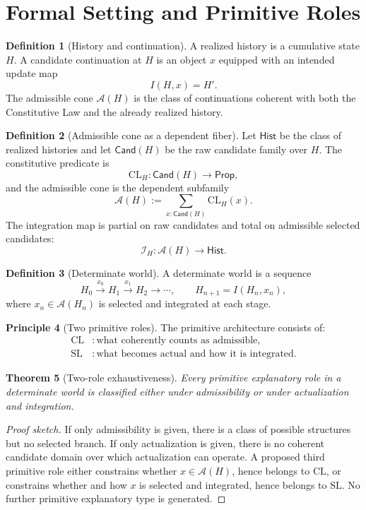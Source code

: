 \documentclass[11pt]{article}
\theoremstyle{plain}
\newtheorem{theorem}{Theorem}[section]
\theoremstyle{definition}
\newtheorem{definition}[theorem]{Definition}
\newtheorem{principle}[theorem]{Principle}
\theoremstyle{remark}
\newenvironment{proofsketch}{\begin{proof}[Proof sketch]}{\end{proof}}
\newcommand{\CL}{\mathrm{CL}}
\newcommand{\SLaw}{\mathrm{SL}}
\newcommand{\A}{\mathcal{A}}
\newcommand{\I}{\mathcal{I}}
\newcommand{\Hist}{\mathsf{Hist}}
\newcommand{\Cand}{\mathsf{Cand}}
\begin{document}
\section{Formal Setting and Primitive Roles}

\begin{definition}[History and continuation]
A realized history is a cumulative state \(H\). A candidate continuation at \(H\) is an object \(x\) equipped with an intended update map
\[
I(H,x)=H'.
\]
The admissible cone \(\A(H)\) is the class of continuations coherent with both the Constitutive Law and the already realized history.
\end{definition}

\begin{definition}[Admissible cone as a dependent fiber]
Let \(\Hist\) be the class of realized histories and let \(\Cand(H)\) be the raw candidate family over \(H\). The constitutive predicate is
\[
\CL_H:\Cand(H)\to\mathsf{Prop},
\]
and the admissible cone is the dependent subfamily
\[
\A(H):=\sum_{x:\Cand(H)}\CL_H(x).
\]
The integration map is partial on raw candidates and total on admissible selected candidates:
\[
\I_H:\A(H)\to\Hist.
\]
\end{definition}

\begin{definition}[Determinate world]
A determinate world is a sequence
\[
H_0 \xrightarrow{x_0} H_1 \xrightarrow{x_1} H_2 \to \cdots,
\qquad
H_{n+1}=I(H_n,x_n),
\]
where \(x_n\in\A(H_n)\) is selected and integrated at each stage.
\end{definition}

\begin{principle}[Two primitive roles]
The primitive architecture consists of:
\[
\begin{aligned}
\CL &: \text{what coherently counts as admissible},\\
\SLaw &: \text{what becomes actual and how it is integrated}.
\end{aligned}
\]
\end{principle}

\begin{theorem}[Two-role exhaustiveness]
Every primitive explanatory role in a determinate world is classified either under admissibility or under actualization and integration.
\end{theorem}

\begin{proofsketch}
If only admissibility is given, there is a class of possible structures but no selected branch. If only actualization is given, there is no coherent candidate domain over which actualization can operate. A proposed third primitive role either constrains whether \(x\in\A(H)\), hence belongs to \(\CL\), or constrains whether and how \(x\) is selected and integrated, hence belongs to \(\SLaw\). No further primitive explanatory type is generated.
\end{proofsketch}
\end{document}
